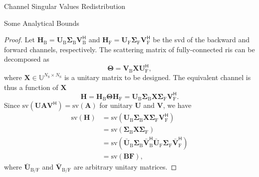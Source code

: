 \documentclass[journal]{IEEEtran}
\begin{document}
\begin{section}{Channel Singular Values Redistribution}
\begin{subsection}{Some Analytical Bounds}
		\begin{proof}
			Let $\mathbf{H}_\mathrm{B} = \mathbf{U}_\mathrm{B} \mathbf{\Sigma}_\mathrm{B} \mathbf{V}_\mathrm{B}^\mathsf{H}$ and $\mathbf{H}_\mathrm{F} = \mathbf{U}_\mathrm{F} \mathbf{\Sigma}_\mathrm{F} \mathbf{V}_\mathrm{F}^\mathsf{H}$ be the \gls{svd} of the backward and forward channels, respectively.
			The scattering matrix of fully-connected \gls{ris} can be decomposed as
			\begin{equation}
				\mathbf{\Theta} = \mathbf{V}_\mathrm{B} \mathbf{X} \mathbf{U}_\mathrm{F}^\mathsf{H},
				\label{eq:scattering_fc}
			\end{equation}
			where $\mathbf{X} \in \mathbb{U}^{N_\mathrm{S} \times N_\mathrm{S}}$ is a unitary matrix to be designed.
			The equivalent channel is thus a function of $\mathbf{X}$
			\begin{equation}
				\mathbf{H} = \mathbf{H}_\mathrm{B} \mathbf{\Theta} \mathbf{H}_\mathrm{F} = \mathbf{U}_\mathrm{B} \mathbf{\Sigma}_\mathrm{B} \mathbf{X} \mathbf{\Sigma}_\mathrm{F} \mathbf{V}_\mathrm{F}^\mathsf{H}.
				\label{eq:channel_equivalent_fc}
			\end{equation}
			Since $\mathrm{sv}(\mathbf{U} \mathbf{A} \mathbf{V}^\mathsf{H}) = \mathrm{sv}(\mathbf{A})$ for unitary $\mathbf{U}$ and $\mathbf{V}$, we have
			\begin{align*}
				\mathrm{sv}(\mathbf{H}) & = \mathrm{sv}(\mathbf{U}_\mathrm{B} \mathbf{\Sigma}_\mathrm{B} \mathbf{X} \mathbf{\Sigma}_\mathrm{F} \mathbf{V}_\mathrm{F}^\mathsf{H})\\
				& = \mathrm{sv}(\mathbf{\Sigma}_\mathrm{B} \mathbf{X} \mathbf{\Sigma}_\mathrm{F})\\
				& = \mathrm{sv}(\bar{\mathbf{U}}_\mathrm{B} \mathbf{\Sigma}_\mathrm{B} \mathbf{\bar{V}}_\mathrm{B}^\mathsf{H} \bar{\mathbf{U}}_\mathrm{F} \mathbf{\Sigma}_\mathrm{F} \mathbf{\bar{V}}_\mathrm{F}^\mathsf{H})\\
				& = \mathrm{sv}(\mathbf{BF}),
			\end{align*}
			where $\bar{\mathbf{U}}_{\mathrm{B}/\mathrm{F}}$ and $\bar{\mathbf{V}}_{\mathrm{B}/\mathrm{F}}$ are arbitrary unitary matrices.
		\end{proof}


\end{subsection}
\end{section}
\end{document}
